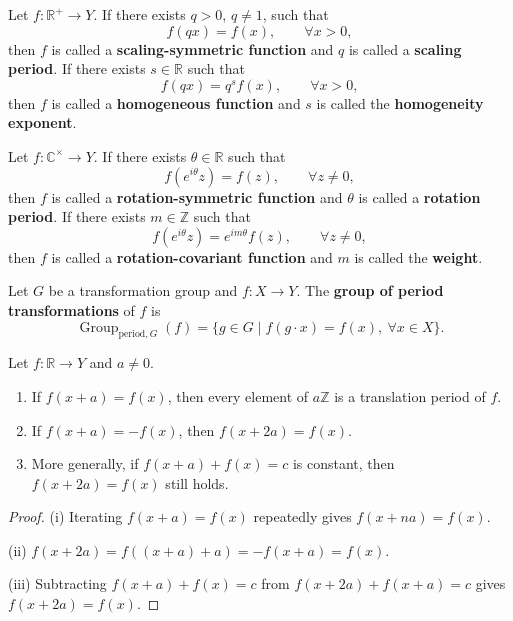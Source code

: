 \begin{definition}\label{def:scaling_symmetric_function}
Let $f:\mathbb{R}^+\to Y$. If there exists $q>0$, $q\neq 1$, such that
\[
f(qx)=f(x),\qquad \forall x>0,
\]
then $f$ is called a \textbf{scaling-symmetric function} and $q$ is called a \textbf{scaling period}. If there exists $s\in\mathbb{R}$ such that
\[
f(qx)=q^s f(x),\qquad \forall x>0,
\]
then $f$ is called a \textbf{homogeneous function} and $s$ is called the \textbf{homogeneity exponent}.
\end{definition}

\begin{definition}\label{def:rotation_symmetric_function}
Let $f:\mathbb{C}^\times\to Y$. If there exists $\theta\in\mathbb{R}$ such that
\[
f(e^{i\theta}z)=f(z),\qquad \forall z\neq 0,
\]
then $f$ is called a \textbf{rotation-symmetric function} and $\theta$ is called a \textbf{rotation period}. If there exists $m\in\mathbb{Z}$ such that
\[
f(e^{i\theta}z)=e^{im\theta}f(z),\qquad \forall z\neq 0,
\]
then $f$ is called a \textbf{rotation-covariant function} and $m$ is called the \textbf{weight}.
\end{definition}

\begin{definition}\label{def:period_group}
Let $G$ be a transformation group and $f:X\to Y$. The \textbf{group of period transformations} of $f$ is
\[
\operatorname{Group}_{\mathrm{period},G}(f)
=\{g\in G\mid f(g\cdot x)=f(x),\ \forall x\in X\}.
\]
\end{definition}

\begin{proposition}\label{prop:translation_antiperiod}
Let $f:\mathbb{R}\to Y$ and $a\neq 0$.
\begin{enumerate}[label=(\roman*)]
    \item If $f(x+a)=f(x)$, then every element of $a\mathbb{Z}$ is a translation period of $f$.
    \item If $f(x+a)=-f(x)$, then $f(x+2a)=f(x)$.
    \item More generally, if $f(x+a)+f(x)=c$ is constant, then $f(x+2a)=f(x)$ still holds.
\end{enumerate}
\end{proposition}

\begin{proof}
(i) Iterating $f(x+a)=f(x)$ repeatedly gives $f(x+na)=f(x)$.

(ii) $f(x+2a)=f((x+a)+a)=-f(x+a)=f(x)$.

(iii) Subtracting $f(x+a)+f(x)=c$ from $f(x+2a)+f(x+a)=c$ gives $f(x+2a)=f(x)$.
\end{proof}

